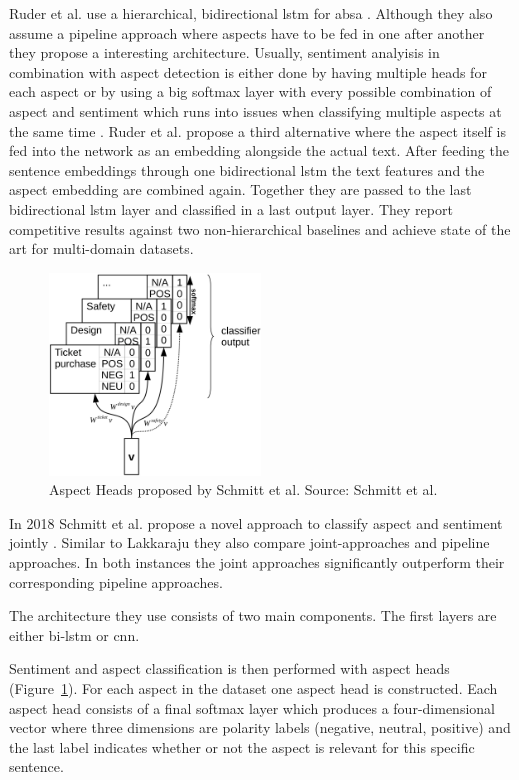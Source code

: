 Ruder et al. use a hierarchical, bidirectional \gls{lstm} for \gls{absa} \cite{Ruder2016}. Although they also assume a pipeline approach where aspects have to be fed in one after another they propose a interesting architecture. Usually, sentiment analyisis in combination with aspect detection is either done by having multiple heads for each aspect \cite{Schmitt2018} or by using a big softmax layer with every possible combination of aspect and sentiment which runs into issues when classifying multiple aspects at the same time \cite{Lakkaraju2014}. Ruder et al. propose a third alternative where the aspect itself is fed into the network as an embedding alongside the actual text. After feeding the sentence embeddings through one bidirectional \gls{lstm} the text features and the aspect embedding are combined again. Together they are passed to the last bidirectional \gls{lstm} layer and classified in a last output layer. They report competitive results against two non-hierarchical baselines and achieve state of the art for multi-domain datasets.
\medskip
\begin{figure}[htp]
	\centering
	\includegraphics[width=0.5\textwidth]{figures/02_relatedWork/02_jabsa}
	\caption{Aspect Heads proposed by Schmitt et al. Source: Schmitt et al. \cite{Schmitt2018}}
	\label{fig:02_j-absa}
\end{figure}

In 2018 Schmitt et al. propose a novel approach to classify aspect and sentiment jointly \cite{Schmitt2018}. Similar to Lakkaraju they also compare joint-approaches and pipeline approaches. In both instances the joint approaches significantly outperform their corresponding pipeline approaches. 

The architecture they use consists of two main components. The first layers are either bi-\gls{lstm} or \gls{cnn}. 

Sentiment and aspect classification is then performed with aspect heads {(Figure~\ref{fig:02_j-absa})}. For each aspect in the dataset one aspect head is constructed. Each aspect head consists of a final softmax layer which produces a four-dimensional vector where three dimensions are polarity labels {(negative, neutral, positive)} and the last label indicates whether or not the aspect is relevant for this specific sentence. 
\medskip

